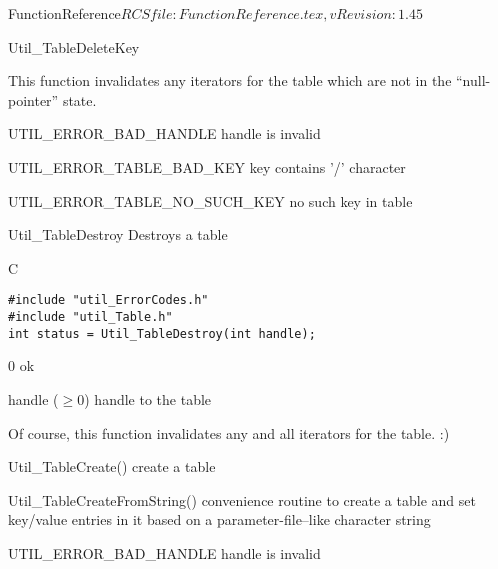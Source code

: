 \begin{cactuspart}{5}{FunctionReference}{$RCSfile: FunctionReference.tex,v $}{$Revision: 1.45 $}
\begin{FunctionDescription}{Util\_TableDeleteKey}
\begin{Discussion}
This function invalidates any iterators for the table which are
not in the ``null-pointer'' state.
\end{Discussion}

\begin{Error}{UTIL\_ERROR\_BAD\_HANDLE}
handle is invalid
\end{Error}
\begin{Error}{UTIL\_ERROR\_TABLE\_BAD\_KEY}
key contains '/' character
\end{Error}
\begin{Error}{UTIL\_ERROR\_TABLE\_NO\_SUCH\_KEY}
no such key in table
\end{Error}
\end{FunctionDescription}


\begin{FunctionDescription}{Util\_TableDestroy}
\label{Util-TableDestroy}
Destroys a table

\begin{Synopsis}{C}
\begin{verbatim}
#include "util_ErrorCodes.h"
#include "util_Table.h"
int status = Util_TableDestroy(int handle);
\end{verbatim}
\end{Synopsis}

\begin{Result}{\rm 0}
ok
\end{Result}

\begin{Parameter}{handle ($\ge 0$)}
handle to the table
\end{Parameter}

\begin{Discussion}
Of course, this function invalidates any and all iterators for the table. :)
\end{Discussion}

\begin{SeeAlso}{Util\_TableCreate()}
create a table
\end{SeeAlso}
\begin{SeeAlso}{Util\_TableCreateFromString()}
convenience routine to create a table and set key/value entries
in it based on a parameter-file--like character string
\end{SeeAlso}

\begin{Error}{UTIL\_ERROR\_BAD\_HANDLE}
handle is invalid
\end{Error}


\end{FunctionDescription}
\end{cactuspart}
